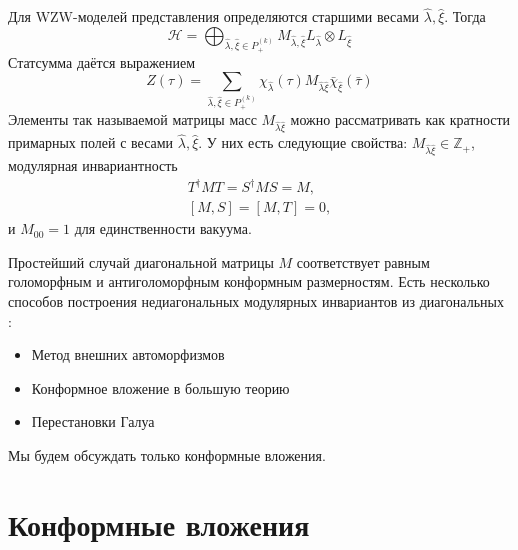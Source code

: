 \documentclass[a4paper,12pt]{article}
\theoremstyle{definition} \newtheorem{Def}{Definition}
\begin{document}
Для WZW-моделей представления определяются старшими весами $\hat \lambda, \hat \xi$. Тогда
\begin{equation}
  \label{eq:6}
  \mathcal{H}=\bigoplus_{\hat \lambda,\hat \xi\in P^{(k)}_{+}}M_{\hat \lambda,\hat \xi} L_{\hat \lambda}\otimes L_{\hat \xi}
\end{equation}
Статсумма даётся выражением
\begin{equation}
  \label{eq:7}
  Z(\tau)=\sum_{\hat \lambda,\hat \xi\in P^{(k)}_{+}} \chi_{\hat \lambda}(\tau)M_{\hat \lambda\hat\xi}\bar \chi_{\hat \xi}(\bar \tau)
\end{equation}
Элементы так называемой матрицы масс $M_{\hat \lambda\hat\xi}$ можно рассматривать как кратности примарных полей с весами $\hat\lambda,\hat \xi$. У них есть следующие свойства: $M_{\hat \lambda\hat\xi}\in \mathbb{Z}_+$, модулярная инвариантность
\begin{equation}
  \label{eq:8}
  \begin{aligned}
    T^{\dagger}MT=S^{\dagger}MS=M,\\
    [M,S]=[M,T]=0,
  \end{aligned}
\end{equation}
и $M_{00}=1$ для единственности вакуума.

Простейший случай диагональной матрицы $M$ соответствует равным голоморфным и антиголоморфным конформным размерностям. Есть несколько способов построения недиагональных модулярных инвариантов из диагональных \cite{difrancesco1997cft}:
\begin{itemize}
\item Метод внешних автоморфизмов
\item Конформное вложение в большую теорию
\item Перестановки Галуа
\end{itemize}
Мы будем обсуждать только конформные вложения.

\section{Конформные вложения}
\label{sec:conformal-embeddings}
\end{document}
